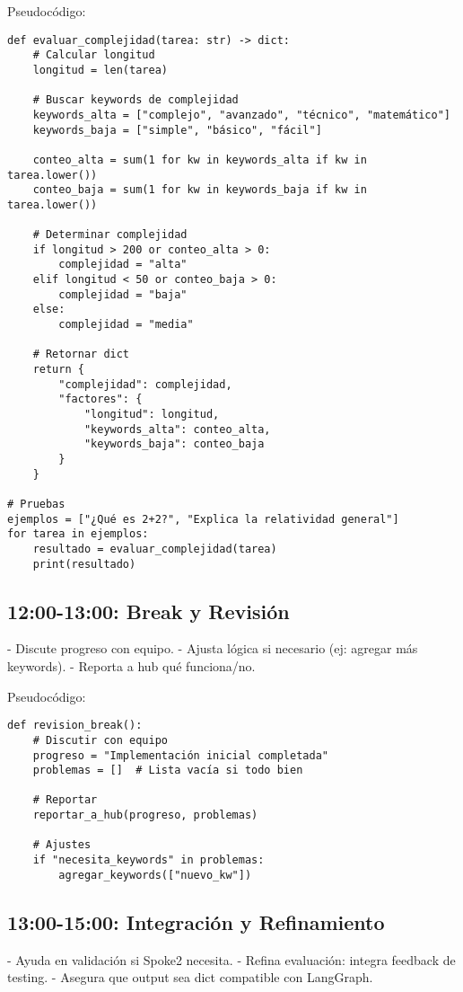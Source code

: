 \documentclass{article}
\begin{document}
Pseudocódigo:
\begin{lstlisting}
def evaluar_complejidad(tarea: str) -> dict:
    # Calcular longitud
    longitud = len(tarea)
    
    # Buscar keywords de complejidad
    keywords_alta = ["complejo", "avanzado", "técnico", "matemático"]
    keywords_baja = ["simple", "básico", "fácil"]
    
    conteo_alta = sum(1 for kw in keywords_alta if kw in tarea.lower())
    conteo_baja = sum(1 for kw in keywords_baja if kw in tarea.lower())
    
    # Determinar complejidad
    if longitud > 200 or conteo_alta > 0:
        complejidad = "alta"
    elif longitud < 50 or conteo_baja > 0:
        complejidad = "baja"
    else:
        complejidad = "media"
    
    # Retornar dict
    return {
        "complejidad": complejidad,
        "factores": {
            "longitud": longitud,
            "keywords_alta": conteo_alta,
            "keywords_baja": conteo_baja
        }
    }

# Pruebas
ejemplos = ["¿Qué es 2+2?", "Explica la relatividad general"]
for tarea in ejemplos:
    resultado = evaluar_complejidad(tarea)
    print(resultado)
\end{lstlisting}

\subsection{12:00-13:00: Break y Revisión}
- Discute progreso con equipo.
- Ajusta lógica si necesario (ej: agregar más keywords).
- Reporta a hub qué funciona/no.

Pseudocódigo:
\begin{lstlisting}
def revision_break():
    # Discutir con equipo
    progreso = "Implementación inicial completada"
    problemas = []  # Lista vacía si todo bien
    
    # Reportar
    reportar_a_hub(progreso, problemas)
    
    # Ajustes
    if "necesita_keywords" in problemas:
        agregar_keywords(["nuevo_kw"])
\end{lstlisting}

\subsection{13:00-15:00: Integración y Refinamiento}
- Ayuda en validación si Spoke2 necesita.
- Refina evaluación: integra feedback de testing.
- Asegura que output sea dict compatible con LangGraph.
\end{document}
